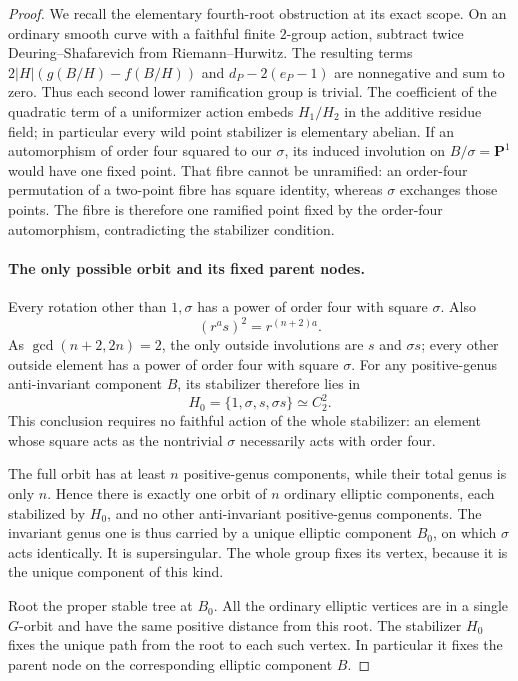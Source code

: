 \begin{proof}
We recall the elementary fourth-root obstruction at its exact
scope. On an ordinary smooth curve with a faithful finite
\(2\)-group action, subtract twice Deuring--Shafarevich
from Riemann--Hurwitz. The resulting terms
\(2|H|(g(B/H)-f(B/H))\) and
\(d_P-2(e_P-1)\) are nonnegative and sum to zero.
Thus each second lower ramification group is trivial.
The coefficient of the quadratic term of a uniformizer
action embeds \(H_1/H_2\) in the additive residue field;
in particular every wild point stabilizer is elementary
abelian. If an automorphism of order four squared to our
\(\sigma\), its induced involution on \(B/\sigma=\mathbf P^1\)
would have one fixed point. That fibre cannot be unramified:
an order-four permutation of a two-point fibre has square
identity, whereas \(\sigma\) exchanges those points.
The fibre is therefore one ramified point fixed by the
order-four automorphism, contradicting the stabilizer condition.
\cite[\S2.2, equation (3) and Exercise 2.12(c)]{fghBouwWewers}

\paragraph{The only possible orbit and its fixed parent nodes.}
Every rotation other than \(1,\sigma\) has a power of
order four with square \(\sigma\). Also
\[
                    (r^a s)^2=r^{(n+2)a}.             \tag{A.75.7}
\]
As \(\gcd(n+2,2n)=2\), the only outside involutions
are \(s\) and \(\sigma s\); every other outside element
has a power of order four with square \(\sigma\).
For any positive-genus anti-invariant component \(B\),
its stabilizer therefore lies in
\[
              H_0=\{1,\sigma,s,\sigma s\}\simeq C_2^2.
                                                        \tag{A.75.8}
\]
This conclusion requires no faithful action of the whole
stabilizer: an element whose square acts as the nontrivial
\(\sigma\) necessarily acts with order four.

The full orbit has at least \(n\) positive-genus components,
while their total genus is only \(n\). Hence there is
exactly one orbit of \(n\) ordinary elliptic components,
each stabilized by \(H_0\), and no other anti-invariant
positive-genus components. The invariant genus one is thus
carried by a unique elliptic component \(B_0\), on which
\(\sigma\) acts identically. It is supersingular.
The whole group fixes its vertex, because it is the unique
component of this kind.

Root the proper stable tree at \(B_0\). All the ordinary
elliptic vertices are in a single \(G\)-orbit and have
the same positive distance from this root. The stabilizer
\(H_0\) fixes the unique path from the root to each such
vertex. In particular it fixes the parent node on the
corresponding elliptic component \(B\).


\end{proof}
